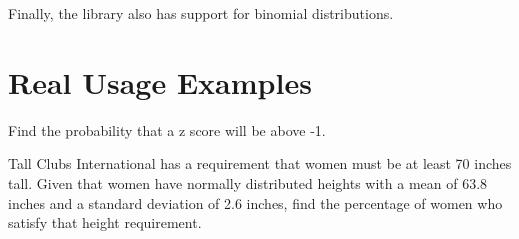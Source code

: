 \documentclass[11pt,letterpaper]{article}
\begin{document}
Finally, the library also has support for binomial distributions.

\begin{center}
\begin{BinomDist}{10}{0.2}
\end{BinomDist}
\end{center}  

\begin{center}
\begin{BinomDist}{8}{0.5}
\end{BinomDist}
\end{center}  

\section{Real Usage Examples}

Find the probability that a z score will be above -1. 

\begin{center}
  \begin{NormDist}
  \end{NormDist}
\end{center}

  Tall Clubs International has a requirement that women must be at
  least 70 inches tall.  Given that women have normally distributed
  heights with a mean of 63.8 inches and a standard deviation of 2.6
  inches, find the percentage of women who satisfy that height
  requirement.
\end{document}
